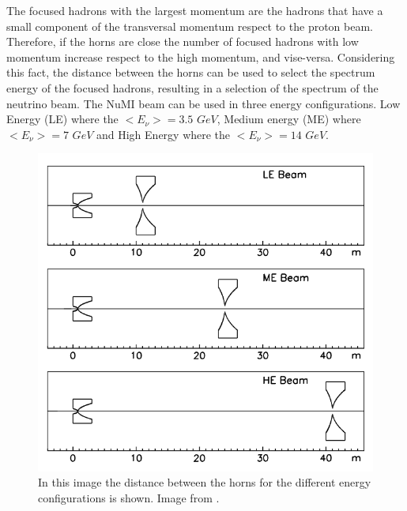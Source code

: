The focused hadrons with the largest momentum are the hadrons that have a small component of the transversal momentum respect to the proton beam. Therefore, if the horns are close the number of focused hadrons with low momentum increase respect to the high momentum, and vise-versa. Considering this fact, the distance between the horns can be used to select the spectrum energy of the focused hadrons, resulting in a selection of the spectrum of the neutrino beam. The NuMI beam can be used in three energy configurations. Low Energy (LE) where the $<E_\nu>=3.5$ $GeV$, Medium energy (ME) where $<E_\nu>=7$ $GeV$ and High Energy where the $<E_\nu> = 14$ $GeV$\cite{BeamOptics}. 

\begin{figure}[!htb]
\centering
\includegraphics[scale=0.4]{Figures/Chapter2/HornsDistance.png}
        \caption{In this image the distance between the horns for the different energy configurations is shown. Image from \cite{BeamOptics}.} 
\label{fig:MnvExp:NuMI:NuMIHornDistance}
\end{figure}

